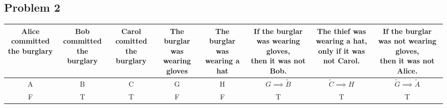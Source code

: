 \documentclass{article}
\begin{document}
\begin{landscape}
    \section*{Problem 2}
    \footnotesize
    \begin{tabular}{|c|c|c|c|c|c|c|c|}
        \hline
        \makecell{Alice committed                                                                                                                               \\the burglary} &
        \makecell{Bob committed                                                                                                                                 \\the burglary} &
        \makecell{Carol comitted                                                                                                                                \\the burglary} &
        \makecell{The burglar was                                                                                                                               \\wearing gloves} &
        \makecell{The burglar was                                                                                                                               \\wearing a hat} &
        \makecell{If the burglar was wearing gloves,                                                                                                            \\ then it was not Bob.} &
        \makecell{The thief was wearing a hat,                                                                                                                  \\ only if it was not Carol.} &
        \makecell{If the burglar was not wearing gloves,                                                                                                        \\ then it was not Alice.} \\
        \hline
        A          & B          & C          & G          & H          & \(G \implies \tilde{B}\) & \(\tilde{C} \implies H\) & \(\tilde{G} \implies \tilde{A}\) \\
        \hline
        F          & T          & T          & F          & F          & T                        & T                        & T                                \\

\end{tabular}
\end{landscape}
\end{document}

